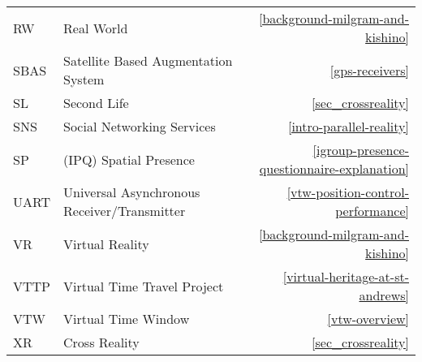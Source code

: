 \begin{center}
\begin{longtable}{l p{8cm} r}
RW & \centering Real World & \ref{background-milgram-and-kishino} \\

SBAS & \centering Satellite Based Augmentation System & \ref{gps-receivers} \\

SL & \centering Second Life & \ref{sec_crossreality} \\

SNS & \centering Social Networking Services & \ref{intro-parallel-reality} \\

SP & \centering (IPQ) Spatial Presence & \ref{igroup-presence-questionnaire-explanation} \\

UART & \centering Universal Asynchronous Receiver/Transmitter & \ref{vtw-position-control-performance} \\

VR & \centering Virtual Reality & \ref{background-milgram-and-kishino} \\

VTTP & \centering Virtual Time Travel Project & \ref{virtual-heritage-at-st-andrews} \\

VTW & \centering Virtual Time Window & \ref{vtw-overview} \\

XR & \centering Cross Reality & \ref{sec_crossreality} \\

\bottomrule

\end{longtable}
\end{center}

